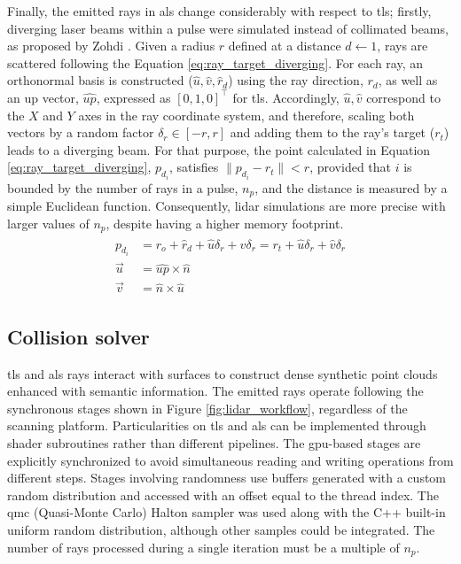 Finally, the emitted rays in \acrshort{als} change considerably with respect to \acrshort{tls}; firstly, diverging laser beams within a pulse were simulated instead of collimated beams, as proposed by Zohdi \cite{zohdi_rapid_2020}. Given a radius $r$ defined at a distance $d \gets 1$, rays are scattered following the Equation \ref{eq:ray_target_diverging}. For each ray, an orthonormal basis is constructed ($\hat{u}, \hat{v}, \hat{r}_{d}$) using the ray direction, $r_{d}$, as well as an up vector, $\widehat{\textit{up}}$, expressed as $\left[0, 1, 0\right]^\intercal$ for \acrshort{tls}. Accordingly, $\hat{u}, \hat{v}$ correspond to the $X$ and $Y$ axes in the ray coordinate system, and therefore, scaling both vectors by a random factor $\delta_{r} \in [-r, r]$ and adding them to the ray's target ($r_{t}$) leads to a diverging beam. For that purpose, the point calculated in Equation \ref{eq:ray_target_diverging}, $p_{d_{i}}$, satisfies $\lVert p_{d_{i}} - r_{t}\rVert < r$, provided that $i$ is bounded by the number of rays in a pulse, $n_{p}$, and the distance is measured by a simple Euclidean function. Consequently, \acrshort{lidar} simulations are more precise with larger values of $n_{p}$, despite having a higher memory footprint.
\begin{gather}
    \label{eq:ray_target_diverging}
    \begin{aligned}
        p_{d_{i}} &= r_{o} + \hat{r}_{d} + \hat{u}\delta_{r} + \hat{v}\delta_{r} = r_{t} + \hat{u}\delta_{r} + \hat{v}\delta_{r}\\
        \vec{u} &= \widehat{\textit{up}} \times \hat{n}\\
        \vec{v} &= \hat{n} \times \hat{u}
    \end{aligned}
\end{gather}

\subsection{Collision solver}

\acrshort{tls} and \acrshort{als} rays interact with surfaces to construct dense synthetic point clouds enhanced with semantic information. The emitted rays operate following the synchronous stages shown in Figure \ref{fig:lidar_workflow}, regardless of the scanning platform. Particularities on \acrshort{tls} and \acrshort{als} can be implemented through shader subroutines rather than different pipelines. The \acrshort{gpu}-based stages are explicitly synchronized to avoid simultaneous reading and writing operations from different steps. Stages involving randomness use buffers generated with a custom random distribution and accessed with an offset equal to the thread index. The \acrshort{qmc} (Quasi-Monte Carlo) Halton sampler was used along with the C++ built-in uniform random distribution, although other samples could be integrated. The number of rays processed during a single iteration must be a multiple of $n_{p}$.

